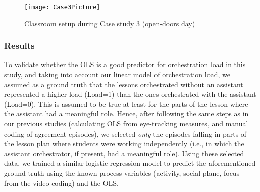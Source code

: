 \documentclass[10pt,journal,compsoc]{IEEEtran}
\begin{document}

\begin{figure}[!t]
\centering
\texttt{[image: Case3Picture]}
\caption{Classroom setup during Case study 3 (open-doors day)}
\label{fig:case3picture}
\end{figure}


\subsubsection{Results}

To validate whether the OLS is a good predictor for orchestration load in this study, and taking into account our linear model of orchestration load, we assumed as a ground truth that the lessons orchestrated without an assistant represented a higher load (Load=1) than the ones orchestrated with the assistant (Load=0). This is assumed to be true at least for the parts of the lesson where the assistant had a meaningful role. Hence, after following the same steps as in our previous studies (calculating OLS from eye-tracking measures, and manual coding of agreement episodes), we selected \textit{only} the episodes falling in parts of the lesson plan where students were working independently (i.e., in which the assistant orchestrator, if present, had a meaningful role). Using these selected data, we trained a similar logistic regression model to predict the aforementioned ground truth using the known process variables (activity, social plane, focus -- from the video coding) and the OLS.
\end{document}
